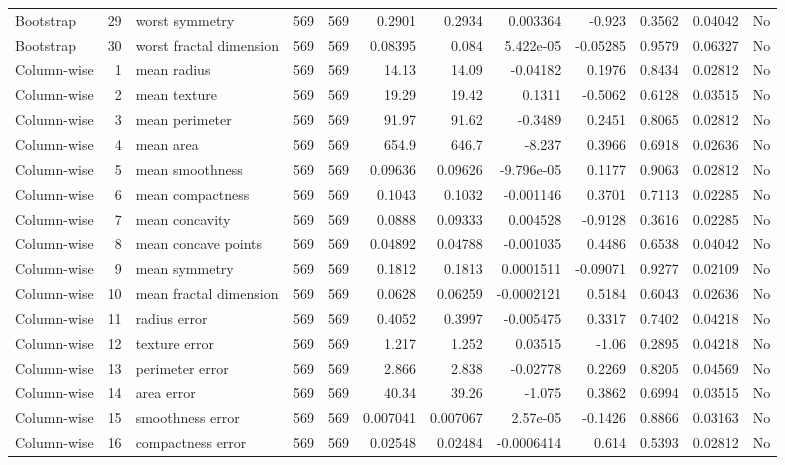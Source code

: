 \begin{longtable}{lrp{}rrrrrrrrl}
Bootstrap & 29 & worst symmetry & 569 & 569 & 0.2901 & 0.2934 & 0.003364 & -0.923 & 0.3562 & 0.04042 & No \\
Bootstrap & 30 & worst fractal dimension & 569 & 569 & 0.08395 & 0.084 & 5.422e-05 & -0.05285 & 0.9579 & 0.06327 & No \\
Column-wise & 1 & mean radius & 569 & 569 & 14.13 & 14.09 & -0.04182 & 0.1976 & 0.8434 & 0.02812 & No \\
Column-wise & 2 & mean texture & 569 & 569 & 19.29 & 19.42 & 0.1311 & -0.5062 & 0.6128 & 0.03515 & No \\
Column-wise & 3 & mean perimeter & 569 & 569 & 91.97 & 91.62 & -0.3489 & 0.2451 & 0.8065 & 0.02812 & No \\
Column-wise & 4 & mean area & 569 & 569 & 654.9 & 646.7 & -8.237 & 0.3966 & 0.6918 & 0.02636 & No \\
Column-wise & 5 & mean smoothness & 569 & 569 & 0.09636 & 0.09626 & -9.796e-05 & 0.1177 & 0.9063 & 0.02812 & No \\
Column-wise & 6 & mean compactness & 569 & 569 & 0.1043 & 0.1032 & -0.001146 & 0.3701 & 0.7113 & 0.02285 & No \\
Column-wise & 7 & mean concavity & 569 & 569 & 0.0888 & 0.09333 & 0.004528 & -0.9128 & 0.3616 & 0.02285 & No \\
Column-wise & 8 & mean concave points & 569 & 569 & 0.04892 & 0.04788 & -0.001035 & 0.4486 & 0.6538 & 0.04042 & No \\
Column-wise & 9 & mean symmetry & 569 & 569 & 0.1812 & 0.1813 & 0.0001511 & -0.09071 & 0.9277 & 0.02109 & No \\
Column-wise & 10 & mean fractal dimension & 569 & 569 & 0.0628 & 0.06259 & -0.0002121 & 0.5184 & 0.6043 & 0.02636 & No \\
Column-wise & 11 & radius error & 569 & 569 & 0.4052 & 0.3997 & -0.005475 & 0.3317 & 0.7402 & 0.04218 & No \\
Column-wise & 12 & texture error & 569 & 569 & 1.217 & 1.252 & 0.03515 & -1.06 & 0.2895 & 0.04218 & No \\
Column-wise & 13 & perimeter error & 569 & 569 & 2.866 & 2.838 & -0.02778 & 0.2269 & 0.8205 & 0.04569 & No \\
Column-wise & 14 & area error & 569 & 569 & 40.34 & 39.26 & -1.075 & 0.3862 & 0.6994 & 0.03515 & No \\
Column-wise & 15 & smoothness error & 569 & 569 & 0.007041 & 0.007067 & 2.57e-05 & -0.1426 & 0.8866 & 0.03163 & No \\
Column-wise & 16 & compactness error & 569 & 569 & 0.02548 & 0.02484 & -0.0006414 & 0.614 & 0.5393 & 0.02812 & No \\

\end{longtable}
